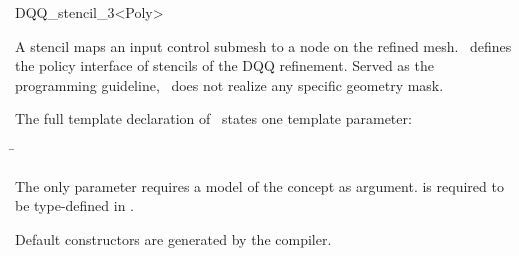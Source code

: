 \begin{ccRefClass}{DQQ_stencil_3<Poly>}

\ccDefinition

A stencil maps an input control submesh to a node on the refined 
mesh. \ccClassTemplateName\ defines the policy interface of 
stencils of the DQQ refinement. Served as the programming guideline,
\ccClassTemplateName\ does not realize any specific geometry mask.


\ccParameters

The full template declaration of \ccClassTemplateName\ states one
template parameter:

\begin{tabbing}
 \= 
\end{tabbing}
   
The only parameter requires a model of 
the  concept as argument.  
is required to be type-defined in .

\ccCreation
{}

Default constructors are generated by the compiler.


\ccThreeToTwo


\ccSeeAlso

\\
\\
\\

\end{ccRefClass}

\ccRefPageEnd




